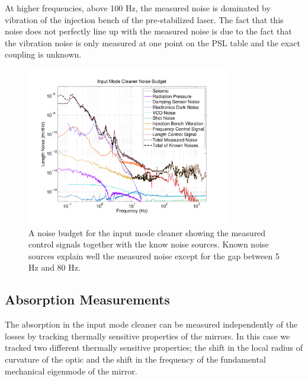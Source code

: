 At higher frequencies, above 100 Hz, the measured noise is dominated by vibration 
of the injection bench of the pre-stabilized laser.  
The fact that this noise does not perfectly line up with the measured noise is due 
to the fact that the vibration noise is only measured at one point on the PSL table 
and the exact coupling is unknown.  


\begin{figure}[htb]
	\centering
	\includegraphics[width = 0.8\textwidth,trim = 2.5cm 1.5cm 2.5cm 1.5cm]{IMC_Noise_Budget.pdf}
	\caption{A noise budget for the input mode cleaner showing the measured control 
		signals together with the know noise sources.  Known noise sources explain 
		well the measured noise except for the gap between 5 Hz and 80 Hz.}
	\label{fig:NoiseBudget}
\end{figure}

\subsection{Absorption Measurements}
The absorption in the input mode cleaner can be measured independently of the losses 
by tracking thermally sensitive properties of the mirrors.  
In this case we tracked two different thermally sensitive properties; 
the shift in the local radius of curvature of the optic 
and the shift in the frequency of the fundamental mechanical eigenmode of the mirror.  

